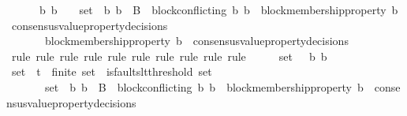 \begin{isabellebody}
\ \ {\isasymlongrightarrow}\ {\isacharparenleft}{\isasymforall}\ {\isasymsigma}\ {\isasymsigma}{\isacharprime}\ b{}\ b{}{\isachardot}\ {\isacharbraceleft}{\isasymsigma}{\isacharcomma}\ {\isasymsigma}{\isacharprime}{\isacharbraceright}\ {\isasymsubseteq}\ {\isasymsigma}{\isacharunderscore}set\ {\isasymand}\ {\isacharbraceleft}b{}{\isacharcomma}\ b{}{\isacharbraceright}\ {\isasymsubseteq}\ B\ {\isasymand}\ block{\isacharunderscore}conflicting\ {\isacharparenleft}b{}{\isacharcomma}\ b{}{\isacharparenright}\ {\isasymand}\ block{\isacharunderscore}membership{\isacharunderscore}property\ b{}\ {\isasymin}\ consensus{\isacharunderscore}value{\isacharunderscore}property{\isacharunderscore}decisions\ {\isasymsigma}\ \isanewline
\ \ \ \ \ \ {\isasymlongrightarrow}\ block{\isacharunderscore}membership{\isacharunderscore}property\ b{}\ {\isasymnotin}\ consensus{\isacharunderscore}value{\isacharunderscore}property{\isacharunderscore}decisions\ {\isasymsigma}{\isacharprime}{\isacharparenright}{\isachardoublequoteclose}\isanewline
%
\isadelimproof
\ \ %
\endisadelimproof
%
\isatagproof
{}\isamarkupfalse%
\ {\isacharparenleft}rule{\isacharcomma}\ rule{\isacharcomma}\ rule{\isacharcomma}\ rule{\isacharcomma}\ rule{\isacharcomma}\ rule{\isacharcomma}\ rule{\isacharcomma}\ rule{\isacharcomma}\ rule{\isacharcomma}\ rule{\isacharparenright}\isanewline
{}\isamarkupfalse%
\ {\isacharminus}\isanewline
\ \ \isamarkupfalse%
\ {\isasymsigma}{\isacharunderscore}set\ {\isasymsigma}\ {\isasymsigma}{\isacharprime}\ b{}\ b{}\isanewline
\ \ \ \isamarkupfalse%
\ {\isachardoublequoteopen}{\isasymsigma}{\isacharunderscore}set\ {\isasymsubseteq}\ {\isasymSigma}t{\isachardoublequoteclose}\ \ {\isachardoublequoteopen}finite\ {\isasymsigma}{\isacharunderscore}set{\isachardoublequoteclose}\ \ {\isachardoublequoteopen}is{\isacharunderscore}faults{\isacharunderscore}lt{\isacharunderscore}threshold\ {\isacharparenleft}{\isasymUnion}{\isasymsigma}{\isacharunderscore}set{\isacharparenright}{\isachardoublequoteclose}\ \isanewline
\ \ \ \ {\isachardoublequoteopen}{\isacharbraceleft}{\isasymsigma}{\isacharcomma}\ {\isasymsigma}{\isacharprime}{\isacharbraceright}\ {\isasymsubseteq}\ {\isasymsigma}{\isacharunderscore}set\ {\isasymand}\ {\isacharbraceleft}b{}{\isacharcomma}\ b{}{\isacharbraceright}\ {\isasymsubseteq}\ B\ {\isasymand}\ block{\isacharunderscore}conflicting\ {\isacharparenleft}b{}{\isacharcomma}\ b{}{\isacharparenright}\ {\isasymand}\ block{\isacharunderscore}membership{\isacharunderscore}property\ b{}\ {\isasymin}\ consensus{\isacharunderscore}value{\isacharunderscore}property{\isacharunderscore}decisions\ {\isasymsigma}{\isachardoublequoteclose}\ \isanewline

\end{isabellebody}
